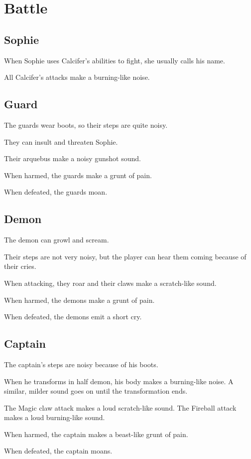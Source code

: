 \section{Battle}

\subsection{Sophie}
When Sophie uses Calcifer's abilities to fight, she usually calls his name.

All Calcifer's attacks make a burning-like noise.

\subsection{Guard}
The guards wear boots, so their steps are quite noisy.

They can insult and threaten Sophie.

Their arquebus make a noisy gunshot sound.

When harmed, the guards make a grunt of pain.

When defeated, the guards moan.

\subsection{Demon}
The demon can growl and scream.

Their steps are not very noisy, but the player can hear them coming because of their cries.

When attacking, they roar and their claws make a scratch-like sound.

When harmed, the demons make a grunt of pain.

When defeated, the demons emit a short cry.

\subsection{Captain}
The captain's steps are noisy because of his boots.

When he transforms in half demon, his body makes a burning-like noise. A similar, milder sound goes on until the transformation ends.

The Magic claw attack makes a loud scratch-like sound. The Fireball attack makes a loud burning-like sound.

When harmed, the captain makes a beast-like grunt of pain.

When defeated, the captain moans.
